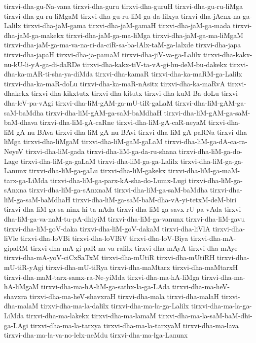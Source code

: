 {tirxvi-dha-gu-Na-vana
tirxvi-dha-guru
tirxvi-dha-guruH
tirxvi-dha-gu-ru-liMga
tirxvi-dha-gu-ru-liMgaM
tirxvi-dha-gu-ru-liM-ga-da-lilxya
tirxvi-dha-jAcnx-na-ga-Lalilx
tirxvi-dha-jaM-gama
tirxvi-dha-jaM-gamaH
tirxvi-dha-jaM-ga-mada
tirxvi-dha-jaM-ga-makekx
tirxvi-dha-jaM-ga-ma-liMga
tirxvi-dha-jaM-ga-ma-liMgaM
tirxvi-dha-jaM-ga-ma-va-na-ri-da-ciR-sa-ba-lAlx-taM-ga-lalxde
tirxvi-dha-japa
tirxvi-dha-japaH
tirxvi-dha-ja-pamaM
tirxvi-dha-jiV-va-ga-Lalilx
tirxvi-dha-kakx-nu-kU-li-yA-ga-di-daRDe
tirxvi-dha-kakx-tiV-ta-vA-gi-hu-deM-bu-dakekx
tirxvi-dha-ka-mAR-ti-sha-ya-diMda
tirxvi-dha-kamaR
tirxvi-dha-ka-maRM-ga-Lalilx
tirxvi-dha-ka-maR-doLu
tirxvi-dha-ka-maR-nAsitx
tirxvi-dha-ka-maRvA
tirxvi-dhakekx
tirxvi-dha-kikxtutx
tirxvi-dha-kitutx
tirxvi-dha-kuM-Ba-doLu
tirxvi-dha-leV-pa-vAgi
tirxvi-dha-liM-gAM-ga-mU-tiR-gaLaM
tirxvi-dha-liM-gAM-ga-saM-baMdha
tirxvi-dha-liM-gAM-ga-saM-baMdhaH
tirxvi-dha-liM-gAM-ga-saM-baM-dhava
tirxvi-dha-liM-gA-caRne
tirxvi-dha-liM-gA-caR-neyaM
tirxvi-dha-liM-gA-nu-BAva
tirxvi-dha-liM-gA-nu-BAvi
tirxvi-dha-liM-gA-paRNa
tirxvi-dha-liMga
tirxvi-dha-liMgaM
tirxvi-dha-liM-gaM-gaLaM
tirxvi-dha-liM-ga-dA-ca-ra-NeyeV
tirxvi-dha-liM-gada
tirxvi-dha-liM-ga-da-ru-shana
tirxvi-dha-liM-ga-do-Lage
tirxvi-dha-liM-ga-gaLaM
tirxvi-dha-liM-ga-ga-Lalilx
tirxvi-dha-liM-ga-ga-Lanunx
tirxvi-dha-liM-ga-gaLu
tirxvi-dha-liM-gakekx
tirxvi-dha-liM-ga-maM-tarx-ga-LiMda
tirxvi-dha-liM-ga-parx-kA-sha-do-Lumx-Lugi
tirxvi-dha-liM-ga-sAnxna
tirxvi-dha-liM-ga-sAnxnaM
tirxvi-dha-liM-ga-saM-baMdha
tirxvi-dha-liM-ga-saM-baMdhaH
tirxvi-dha-liM-ga-saM-baM-dha-vA-yi-tetxM-deM-biri
tirxvi-dha-liM-ga-sa-ninx-hi-ta-nAda
tirxvi-dha-liM-ga-savx-rU-pa-vAda
tirxvi-dha-liM-ga-va-naM-tu-pA-dhiyiM
tirxvi-dha-liM-ga-vanunx
tirxvi-dha-liM-gavu
tirxvi-dha-liM-goV-daka
tirxvi-dha-liM-goV-dakaM
tirxvi-dha-liVlA
tirxvi-dha-liVle
tirxvi-dha-loVBi
tirxvi-dha-loVBiV
tirxvi-dha-loV-Biya
tirxvi-dha-mA-gipaRM
tirxvi-dha-mA-gi-paR-na-va-ralilx
tirxvi-dha-mAyA
tirxvi-dha-mAye
tirxvi-dha-mA-yoV-ciCxSaTxM
tirxvi-dha-mUtiR
tirxvi-dha-mUtiRH
tirxvi-dha-mU-tiR-yAgi
tirxvi-dha-mU-tiRya
tirxvi-dha-maMtarx
tirxvi-dha-maMtarxH
tirxvi-dha-maM-tarx-samx-ra-Ne-yiMda
tirxvi-dha-ma-hA-liMga
tirxvi-dha-ma-hA-liMgaM
tirxvi-dha-ma-hA-liM-ga-sathx-la-ga-LAda
tirxvi-dha-ma-heV-shavxra
tirxvi-dha-ma-heV-shavxraH
tirxvi-dha-mala
tirxvi-dha-malaH
tirxvi-dha-malaM
tirxvi-dha-ma-la-dalilx
tirxvi-dha-ma-la-ga-Lalilx
tirxvi-dha-ma-la-ga-LiMda
tirxvi-dha-ma-lakekx
tirxvi-dha-ma-lamaM
tirxvi-dha-ma-la-saM-baM-dhi-ga-LAgi
tirxvi-dha-ma-la-tarxya
tirxvi-dha-ma-la-tarxyaM
tirxvi-dha-ma-lava
tirxvi-dha-ma-la-va-no-lelx-neMdu
tirxvi-dha-ma-lga-Lanunx
}

